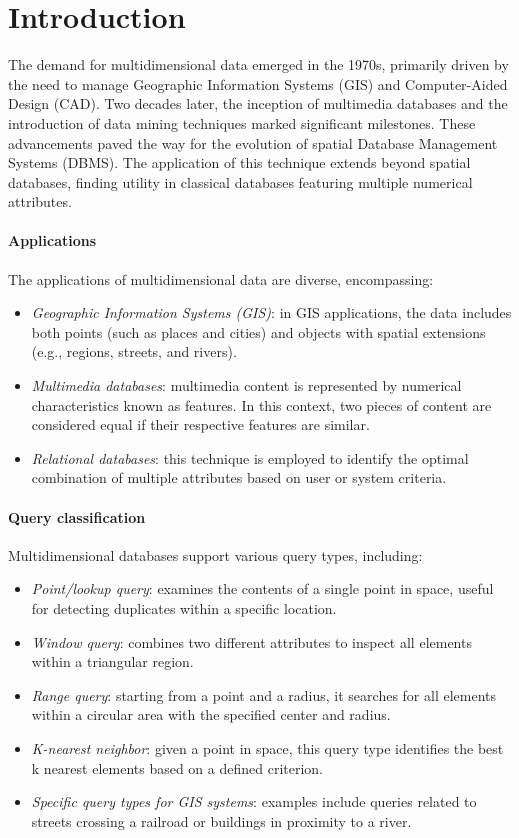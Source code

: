 \section{Introduction}

The demand for multidimensional data emerged in the 1970s, primarily driven by the need to manage Geographic Information Systems (GIS) and Computer-Aided Design (CAD).
Two decades later, the inception of multimedia databases and the introduction of data mining techniques marked significant milestones.
These advancements paved the way for the evolution of spatial Database Management Systems (DBMS).
The application of this technique extends beyond spatial databases, finding utility in classical databases featuring multiple numerical attributes.

\paragraph*{Applications}
The applications of multidimensional data are diverse, encompassing:
\begin{itemize}
    \item \textit{Geographic Information Systems (GIS)}: in GIS applications, the data includes both points (such as places and cities) and objects with spatial extensions (e.g., regions, streets, and rivers).
    \item \textit{Multimedia databases}: multimedia content is represented by numerical characteristics known as features. 
        In this context, two pieces of content are considered equal if their respective features are similar.
    \item \textit{Relational databases}: this technique is employed to identify the optimal combination of multiple attributes based on user or system criteria.
\end{itemize}

\paragraph*{Query classification}
Multidimensional databases support various query types, including:
\begin{itemize}
    \item \textit{Point/lookup query}: examines the contents of a single point in space, useful for detecting duplicates within a specific location.
    \item \textit{Window query}: combines two different attributes to inspect all elements within a triangular region.
    \item \textit{Range query}: starting from a point and a radius, it searches for all elements within a circular area with the specified center and radius.
    \item \textit{K-nearest neighbor}: given a point in space, this query type identifies the best k nearest elements based on a defined criterion.
    \item \textit{Specific query types for GIS systems}: examples include queries related to streets crossing a railroad or buildings in proximity to a river.
\end{itemize}

